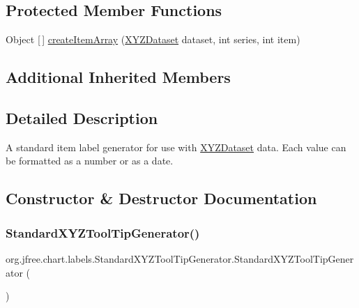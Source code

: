 \subsection*{Protected Member Functions}
\begin{DoxyCompactItemize}
\item 
Object \mbox{[}$\,$\mbox{]} \mbox{\hyperlink{classorg_1_1jfree_1_1chart_1_1labels_1_1_standard_x_y_z_tool_tip_generator_a1e3c05f0aa66c2324cf773afa65a6cb4}{create\+Item\+Array}} (\mbox{\hyperlink{interfaceorg_1_1jfree_1_1data_1_1xy_1_1_x_y_z_dataset}{X\+Y\+Z\+Dataset}} dataset, int series, int item)
\end{DoxyCompactItemize}
\subsection*{Additional Inherited Members}


\subsection{Detailed Description}
A standard item label generator for use with \mbox{\hyperlink{}{X\+Y\+Z\+Dataset}} data. Each value can be formatted as a number or as a date. 

\subsection{Constructor \& Destructor Documentation}
\mbox{\label{classorg_1_1jfree_1_1chart_1_1labels_1_1_standard_x_y_z_tool_tip_generator_a1bc0700851cf5fea7e4a6760389ce568}} 
\subsubsection{\texorpdfstring{Standard\+X\+Y\+Z\+Tool\+Tip\+Generator()}{StandardXYZToolTipGenerator()}\hspace{0.1cm}{\footnotesize\ttfamily [1/3]}}
{\footnotesize\ttfamily org.\+jfree.\+chart.\+labels.\+Standard\+X\+Y\+Z\+Tool\+Tip\+Generator.\+Standard\+X\+Y\+Z\+Tool\+Tip\+Generator (\begin{DoxyParamCaption}{ }\end{DoxyParamCaption})}

